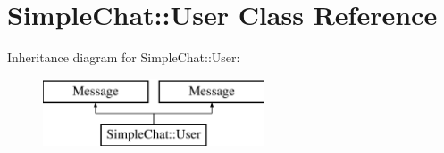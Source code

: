\hypertarget{classSimpleChat_1_1User}{\section{Simple\-Chat\-:\-:User Class Reference}
\label{classSimpleChat_1_1User}
}
Inheritance diagram for Simple\-Chat\-:\-:User\-:\begin{figure}[H]
\begin{center}
\leavevmode
\includegraphics[height=2.000000cm]{classSimpleChat_1_1User}
\end{center}
\end{figure}
